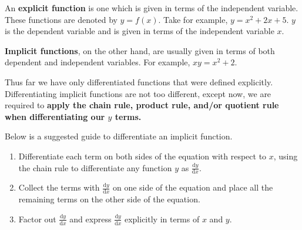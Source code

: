 \documentclass[11pt,a4paper]{book}
\begin{document}
An \textbf{explicit function} is one which is given in terms of the
independent variable. These functions are denoted by $y=f(x)$. Take
for example, $y=x^{2}+2x+5$. $y$ is the dependent variable and is
given in terms of the independent variable $x$.

\textbf{Implicit functions}, on the other hand, are usually given
in terms of both dependent and independent variables. For example,
$xy=x^{2}+2$.

Thus far we have only differentiated functions that were defined explicitly.
Differentiating implicit functions are not too different, except now,
we are required to \textbf{apply the chain rule, product rule, and/or
quotient rule when differentiating our $y$ terms.}

Below is a suggested guide to differentiate an implicit function.

\begin{tcolorbox}[colback=blue!5, colframe=black, boxrule=.4pt, sharpish corners]

\begin{enumerate}
\item Differentiate each term on both sides of the equation with respect
to $x$, using the chain rule to differentiate any function $y$ as
${\displaystyle \frac{\mathrm{d}y}{\mathrm{d}x}}$.
\item Collect the terms with ${\displaystyle \frac{\mathrm{d}y}{\mathrm{d}x}}$ on one side
of the equation and place all the remaining terms on the other side
of the equation.
\item Factor out ${\displaystyle \frac{\mathrm{d}y}{\mathrm{d}x}}$ and express ${\displaystyle \frac{\mathrm{d}y}{\mathrm{d}x}}$
explicitly in terms of $x$ and $y$.
\end{enumerate}
\end{tcolorbox}
\end{document}
